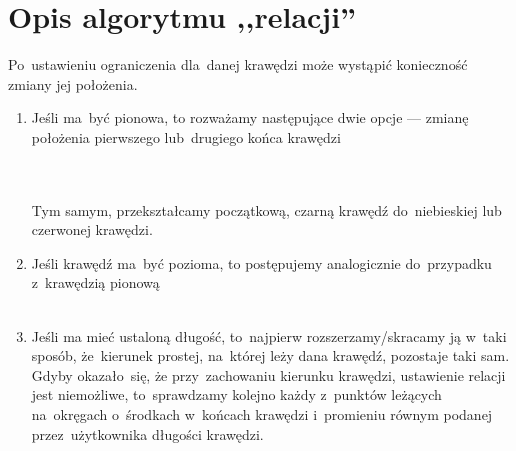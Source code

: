 \documentclass[11pt, a4paper]{article}
\begin{document}
 \section{Opis algorytmu ,,relacji''}
 Po~ustawieniu ograniczenia dla~danej krawędzi może wystąpić konieczność zmiany jej położenia.
 \begin{enumerate}
  \item Jeśli ma~być pionowa, to rozważamy następujące dwie opcje --- zmianę położenia pierwszego lub~drugiego końca krawędzi \\ \\
   \\
  Tym samym, przekształcamy początkową, czarną krawędź do~niebieskiej lub czerwonej krawędzi.
  \item Jeśli krawędź ma~być pozioma, to postępujemy analogicznie do~przypadku z~krawędzią pionową \\ \\
 \item Jeśli ma mieć ustaloną długość, to~najpierw rozszerzamy/skracamy ją w~taki sposób, że~kierunek prostej,
       na~której leży dana krawędź, pozostaje taki sam. Gdyby okazało~się,
       że przy~zachowaniu kierunku krawędzi, ustawienie relacji jest niemożliwe, to~sprawdzamy kolejno każdy z~punktów
       leżących na~okręgach o~środkach w~końcach krawędzi i~promieniu równym podanej przez~użytkownika długości krawędzi.

 \end{enumerate} 
\end{document}
